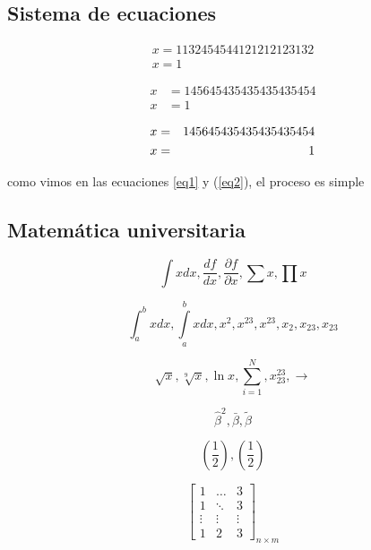 \documentclass{article}
\begin{document}
    \subsection{Sistema de ecuaciones}
        \begin{gather*}
            x=1132454544121212123132\\
            x=1
        \end{gather*}
        
        \begin{align}
            x & = 145645435435435435454 \\
            x & = 1  \label{eq1}
        \end{align}
        
        \begin{eqnarray}
            x & = & 145645435435435435454 \notag \\
            x & = & 1 \label{eq2}
        \end{eqnarray}
        
        como vimos en las ecuaciones \ref{eq1} y (\ref{eq2}), el proceso es simple

    \subsection{Matemática universitaria}
        $$\int xdx, \frac{df}{dx}, \frac{\partial f}{\partial x}, \sum x, \prod x$$
        
        $$ \int_{a}^{b} xdx, \int \limits_{a}^{b} xdx, x^2, x^23, x^{23}, x_2, x_23, x_{23}$$
        
        $$\sqrt{x}, \sqrt[9]{x}, \ln{x}, \sum \limits_{i=1}^{N}, x_{23}^{23}, \longrightarrow $$
        
        $$\hat{\beta}^2, \bar{\beta}, \tilde{\beta}$$
        
        $$(\frac{1}{2}), \left(\frac{1}{2}\right)$$
        
        $$
            \left[
                \begin{array}{ccc}
                    1 & \hdots & 3\\
                    1 & \ddots & 3\\
                    \vdots & \vdots & \vdots \\
                    1 & 2 & 3
                \end{array}
            \right]_{n \times m}
        $$
\end{document}
